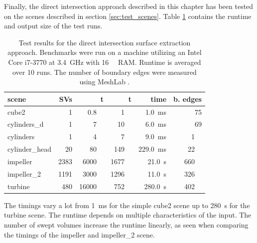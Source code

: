 Finally, the direct intersection approach described in this chapter has been tested on the scenes described in section \ref{sec:test_scenes}.
Table \ref{tbl:direct_intersection_results} contains the runtime and output size of the test runs.
%
\begin{table}[!]
	\centering
	\begin{tabular}{lrrrrr}
		scene          & SVs  & t\sub{in} & t\sub{out} & {time} & b. edges\\
		\midrule
		cube2          &    1 & \SI{  0.8}{\kilo\nothing} & \SI{   1}{\kilo\nothing} & \SI{  1.0}{\milli\second}            & \SI{ 75}{     \nothing} \\
		cylinders\_d   &    1 & \SI{    7}{\kilo\nothing} & \SI{  10}{\kilo\nothing} & \SI{  6.0}{\milli\second}            & \SI{ 69}{     \nothing} \\
		cylinders      &    1 & \SI{    4}{\kilo\nothing} & \SI{   7}{\kilo\nothing} & \SI{  9.0}{\milli\second}            & \SI{  1}{\kilo\nothing} \\ %
		cylinder\_head &   20 & \SI{   80}{\kilo\nothing} & \SI{ 149}{\kilo\nothing} & \SI{229.0}{\milli\second}            & \SI{ 22}{\kilo\nothing} \\ %
		impeller       & 2383 & \SI{ 6000}{\kilo\nothing} & \SI{1677}{\kilo\nothing} & \SI{ 21.0}{      \second}\phantom{m} & \SI{660}{\kilo\nothing} \\ %
		impeller\_2    & 1191 & \SI{ 3000}{\kilo\nothing} & \SI{1296}{\kilo\nothing} & \SI{ 11.0}{      \second}\phantom{m} & \SI{326}{\kilo\nothing} \\ %
		turbine        &  480 & \SI{16000}{\kilo\nothing} & \SI{ 752}{\kilo\nothing} & \SI{280.0}{      \second}\phantom{m} & \SI{402}{\kilo\nothing} \\ %
	\end{tabular}
	\caption{
		Test results for the direct intersection surface extraction approach.
		Benchmarks were run on a machine utilizing an Intel Core i7-3770 at \SI{3.4}{\giga\hertz} with \SI{16}{\gibi\byte} RAM.
		Runtime is averaged over 10 runs.
		The number of boundary edges were measured using MeshLab \cite{meshlab}.
	}
	\label{tbl:direct_intersection_results}
\end{table}
%
The timings vary a lot from \SI{1}{\milli\second} for the simple cube2 scene up to \SI{280}{\second} for the turbine scene.
The runtime depends on multiple characteristics of the input.
The number of swept volumes increase the runtime linearly, as seen when comparing the timings of the impeller and impeller\_2 scene.
